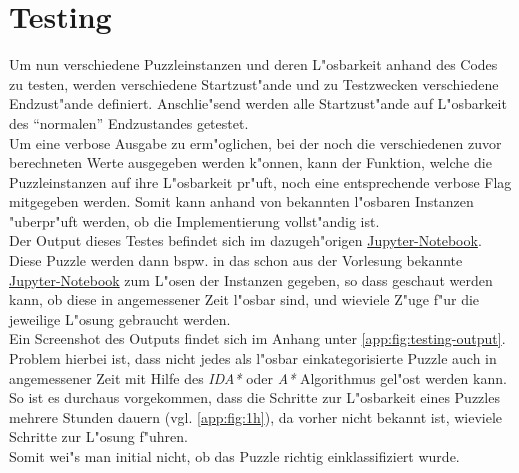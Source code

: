 \section{Testing} %
\label{cha:Testing}
Um nun verschiedene Puzzleinstanzen und deren L"osbarkeit anhand des Codes zu testen, werden verschiedene Startzust"ande und zu Testzwecken verschiedene Endzust"ande definiert. Anschlie"send werden alle Startzust"ande auf L"osbarkeit des \enquote{normalen} Endzustandes getestet.\\
Um eine verbose Ausgabe zu erm"oglichen, bei der noch die verschiedenen zuvor berechneten Werte ausgegeben werden k"onnen, kann der Funktion, welche die Puzzleinstanzen auf ihre L"osbarkeit pr"uft, noch eine entsprechende verbose Flag mitgegeben werden. Somit kann anhand von bekannten l"osbaren Instanzen "uberpr"uft werden, ob die Implementierung vollst"andig ist.\\
Der Output dieses Testes befindet sich im dazugeh"origen \textcolor{violet}{\href{https://github.com/stubifox/ai-termpaper/blob/main/code/15-solvable-v1.ipynb}{Jupyter-Notebook}}.\\
Diese Puzzle werden dann bspw. in das schon aus der Vorlesung bekannte \textcolor{violet}{\href{https://github.com/karlstroetmann/Artificial-Intelligence/blob/master/Python/1\%20Search/Iterative-Deepening-A-Star-Search.ipynb}{Jupyter-Notebook}} zum L"osen der Instanzen gegeben, so dass geschaut werden kann, ob diese in angemessener Zeit l"osbar sind, und wieviele Z"uge f"ur die jeweilige L"osung gebraucht werden. \\
Ein Screenshot des Outputs findet sich im Anhang unter \ref{app:fig:testing-output}.
Problem hierbei ist, dass nicht jedes als l"osbar einkategorisierte Puzzle auch in angemessener Zeit mit Hilfe des \textit{IDA*} oder \textit{A*} Algorithmus gel"ost werden kann. So ist es durchaus vorgekommen, dass die Schritte zur L"osbarkeit eines Puzzles mehrere Stunden dauern (vgl. \ref{app:fig:1h}), da vorher nicht bekannt ist, wieviele Schritte zur L"osung f"uhren.\\
Somit wei"s man initial nicht, ob das Puzzle richtig einklassifiziert wurde.
